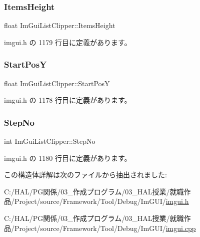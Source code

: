 \mbox{\label{struct_im_gui_list_clipper_a19762cb78ff0adccb414027c25678a60}} 
\subsubsection{\texorpdfstring{Items\+Height}{ItemsHeight}}
{\footnotesize\ttfamily float Im\+Gui\+List\+Clipper\+::\+Items\+Height}



 imgui.\+h の 1179 行目に定義があります。

\mbox{\label{struct_im_gui_list_clipper_affee91b338520cd4bd59b5b680dcb5ae}} 
\subsubsection{\texorpdfstring{Start\+PosY}{StartPosY}}
{\footnotesize\ttfamily float Im\+Gui\+List\+Clipper\+::\+Start\+PosY}



 imgui.\+h の 1178 行目に定義があります。

\mbox{\label{struct_im_gui_list_clipper_a8fe78f0368e16425c33fd35ca45d1912}} 
\subsubsection{\texorpdfstring{Step\+No}{StepNo}}
{\footnotesize\ttfamily int Im\+Gui\+List\+Clipper\+::\+Step\+No}



 imgui.\+h の 1180 行目に定義があります。



この構造体詳解は次のファイルから抽出されました\+:\begin{DoxyCompactItemize}
\item 
C\+:/\+H\+A\+L/\+P\+G関係/03\+\_\+作成プログラム/03\+\_\+\+H\+A\+L授業/就職作品/\+Project/source/\+Framework/\+Tool/\+Debug/\+Im\+G\+U\+I/\mbox{\hyperlink{imgui_8h}{imgui.\+h}}\item 
C\+:/\+H\+A\+L/\+P\+G関係/03\+\_\+作成プログラム/03\+\_\+\+H\+A\+L授業/就職作品/\+Project/source/\+Framework/\+Tool/\+Debug/\+Im\+G\+U\+I/\mbox{\hyperlink{imgui_8cpp}{imgui.\+cpp}}\end{DoxyCompactItemize}
